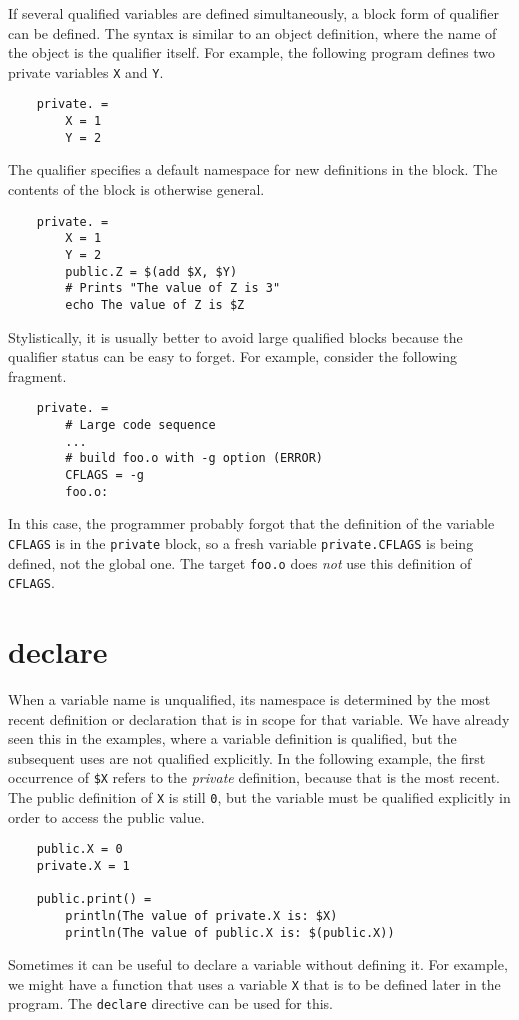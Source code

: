 If several qualified variables are defined simultaneously, a block form of qualifier can be defined.
The syntax is similar to an object definition, where the name of the object is the qualifier itself.
For example, the following program defines two private variables \verb+X+ and \verb+Y+.

\begin{verbatim}
    private. =
        X = 1
        Y = 2
\end{verbatim}
%
The qualifier specifies a default namespace for new definitions in the block.  The contents of the
block is otherwise general.

\begin{verbatim}
    private. =
        X = 1
        Y = 2
        public.Z = $(add $X, $Y)
        # Prints "The value of Z is 3"
        echo The value of Z is $Z
\end{verbatim}
%
Stylistically, it is usually better to avoid large qualified blocks because the qualifier status can
be easy to forget.  For example, consider the following fragment.

\begin{verbatim}
    private. =
        # Large code sequence
        ...
        # build foo.o with -g option (ERROR)
        CFLAGS = -g
        foo.o:
\end{verbatim}
%
In this case, the programmer probably forgot that the definition of the variable \verb+CFLAGS+ is in
the \verb+private+ block, so a fresh variable \verb+private.CFLAGS+ is being defined, not the global
one.  The target \verb+foo.o+ does \emph{not} use this definition of \verb+CFLAGS+.

\section{declare}
\label{section:declare}

When a variable name is unqualified, its namespace is determined by the most recent definition or
declaration that is in scope for that variable.  We have already seen this in the examples, where a
variable definition is qualified, but the subsequent uses are not qualified explicitly.  In the
following example, the first occurrence of \verb+$X+ refers to the \emph{private} definition,
because that is the most recent.  The public definition of \verb+X+ is still \verb+0+, but the
variable must be qualified explicitly in order to access the public value.

\begin{verbatim}
    public.X = 0
    private.X = 1

    public.print() =
        println(The value of private.X is: $X)
        println(The value of public.X is: $(public.X))
\end{verbatim}
%
Sometimes it can be useful to declare a variable without defining it.  For example, we might have a
function that uses a variable \verb+X+ that is to be defined later in the program.  The
\verb+declare+ directive can be used for this.

